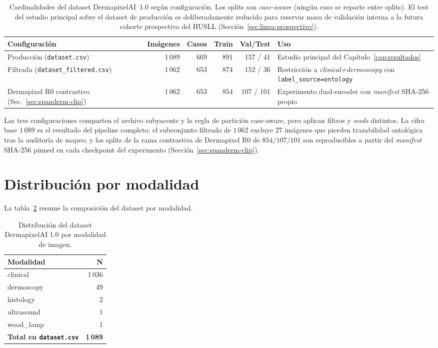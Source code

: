 \begin{table}[H]
\centering
\small
\caption{Cardinalidades del dataset DermapixelAI~1.0 según
configuración. Los splits son \emph{case-aware} (ningún caso se
reparte entre splits). El test del estudio principal sobre el
dataset de producción es deliberadamente reducido para reservar
masa de validación interna a la futura cohorte prospectiva del
HUSLL (Sección~\ref{sec:linea-prospectivo}).}
\label{tab:anexo-cardinalidades}
\begin{tabular}{p{}rrrr p{}}
\hline
Configuración & Imágenes & Casos & Train & Val/Test & Uso \\
\hline
Producción (\texttt{dataset.csv})           & 1\,089 & 669 & 891 & 157 / 41 & Estudio principal del Capítulo~\ref{cap:resultados} \\
Filtrada (\texttt{dataset\_filtered.csv})   & 1\,062 & 653 & 874 & 152 / 36 & Restricción a \emph{clinical+dermoscopy} con \texttt{label\_source=ontology} \\
Dermapixel R0 contrastivo (Sec.~\ref{sec:spanderm-clip}) & 1\,062 & 653 & 854 & 107 / 101 & Experimento dual-encoder con \emph{manifest} SHA-256 propio \\
\hline
\end{tabular}
\end{table}

Las tres configuraciones comparten el archivo subyacente y la
regla de partición case-aware, pero aplican filtros y \emph{seeds}
distintos. La cifra base $1\,089$ es el resultado del pipeline
completo; el subconjunto filtrado de $1\,062$ excluye 27 imágenes
que pierden trazabilidad ontológica tras la auditoría de mapeo; y
los splits de la rama contrastiva de Dermapixel R0 de $854/107/101$ son reproducibles a
partir del \emph{manifest} SHA-256 pinned en cada checkpoint del
experimento (Sección~\ref{sec:spanderm-clip}).

\section{Distribución por modalidad}
\label{sec:anexo-modalidad}

La tabla~\ref{tab:anexo-modalidad} resume la composición del dataset
por modalidad.

\begin{table}[H]
\centering
\small
\caption{Distribución del dataset DermapixelAI 1.0 por modalidad de
imagen.}
\label{tab:anexo-modalidad}
\begin{tabular}{lr}
\hline
Modalidad        & N       \\
\hline
clinical         & 1\,036  \\
dermoscopy       & 49      \\
histology        & 2       \\
ultrasound       & 1       \\
wood\_lamp       & 1       \\
\hline
\textbf{Total en \texttt{dataset.csv}} & \textbf{1\,089} \\
\hline
\end{tabular}
\end{table}

